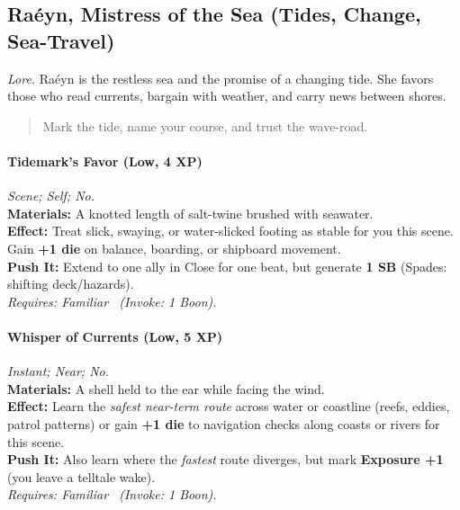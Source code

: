 
\subsection{Raéyn, Mistress of the Sea (Tides, Change, Sea-Travel)}
\textit{Lore.} Raéyn is the restless sea and the promise of a changing tide. She favors those who read currents, bargain with weather, and carry news between shores.

\begin{quote}
Mark the tide, name your course, and trust the wave-road.
\end{quote}

\paragraph{Tidemark's Favor (Low, 4 XP)} \emph{Scene; Self; No.}\\
\textbf{Materials:} A knotted length of salt-twine brushed with seawater.\\
\textbf{Effect:} Treat slick, swaying, or water-slicked footing as stable for you this scene. Gain \textbf{+1 die} on balance, boarding, or shipboard movement.\\
\textbf{Push It:} Extend to one ally in Close for one beat, but generate \textbf{1 SB} (Spades: shifting deck/hazards).\\
\emph{Requires: Familiar \ (\textit{Invoke:} 1 Boon).}

\paragraph{Whisper of Currents (Low, 5 XP)} \emph{Instant; Near; No.}\\
\textbf{Materials:} A shell held to the ear while facing the wind.\\
\textbf{Effect:} Learn the \emph{safest near-term route} across water or coastline (reefs, eddies, patrol patterns) or gain \textbf{+1 die} to navigation checks along coasts or rivers for this scene.\\
\textbf{Push It:} Also learn where the \emph{fastest} route diverges, but mark \textbf{Exposure +1} (you leave a telltale wake).\\
\emph{Requires: Familiar \ (\textit{Invoke:} 1 Boon).}


